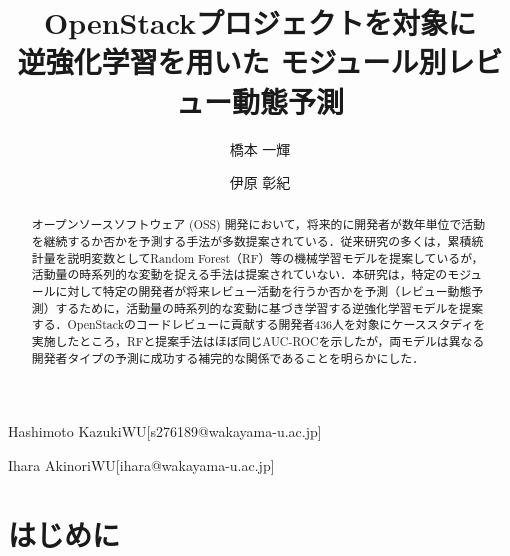 \documentclass[submit,noauthor,ses,dvipdfmx]{ipsj}
\newcommand{\todo}[1]{\colorbox{yellow}{{\bf TODO}:}{\color{red} {\textbf{[#1]}}}}
\begin{document}
\raggedbottom


\title{OpenStackプロジェクトを対象に\\逆強化学習を用いた
モジュール別レビュー動態予測}




\author{橋本  一輝}{Hashimoto Kazuki}{WU}[s276189@wakayama-u.ac.jp]
\author{伊原  彰紀}{Ihara Akinori}{WU}[ihara@wakayama-u.ac.jp]

\vspace{-4mm}
\begin{abstract}
オープンソースソフトウェア (OSS) 開発において，将来的に開発者が数年単位で活動を継続するか否かを予測する手法が多数提案されている．従来研究の多くは，累積統計量を説明変数としてRandom Forest（RF）等の機械学習モデルを提案しているが，活動量の時系列的な変動を捉える手法は提案されていない．本研究は，特定のモジュールに対して特定の開発者が将来レビュー活動を行うか否かを予測（レビュー動態予測）するために，活動量の時系列的な変動に基づき学習する逆強化学習モデルを提案する．OpenStackのコードレビューに貢献する開発者436人を対象にケーススタディを実施したところ，RFと提案手法はほぼ同じAUC-ROCを示したが，両モデルは異なる開発者タイプの予測に成功する補完的な関係であることを明らかにした．
\end{abstract}

\maketitle

\section{はじめに}\label{sec:Introduction}
\end{document}
